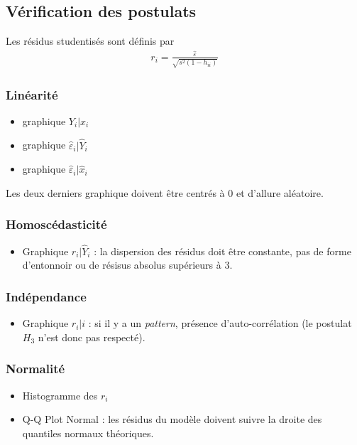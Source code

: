 \documentclass[10pt, french]{article}
\begin{document}
\begin{multicols*}{3}
\subsection*{Vérification des postulats}
Les résidus studentisés sont définis par
\begin{align*}
r_i = \frac{\hat{\varepsilon}}{\sqrt{s^2(1 - h_{ii})}}
\end{align*}
\subsubsection*{Linéarité}
\begin{itemize}
\item graphique $Y_i | x_i$
\item graphique $\hat{\varepsilon}_i | \hat{Y}_i$
\item graphique $\hat{\varepsilon}_i | \hat{x}_i$
\end{itemize}
Les deux derniers graphique doivent être centrés à 0 et d'allure aléatoire.

\subsubsection*{Homoscédasticité}
\begin{itemize}
\item Graphique $r_i | \hat{Y}_i$ : la dispersion des résidus doit être constante, pas de forme d'entonnoir ou de résisus absolus supérieurs à 3.
\end{itemize}

\subsubsection*{Indépendance}
\begin{itemize}
\item Graphique $r_i|i$ : si il y a un \textit{pattern}, présence d'auto-corrélation (le postulat $H_3$ n'est donc pas respecté).
\end{itemize}

\subsubsection*{Normalité}
\begin{itemize}
\item Histogramme des $r_i$
\item Q-Q Plot Normal : les résidus du modèle doivent suivre la droite des quantiles normaux théoriques.
\end{itemize}





\end{multicols*}
\end{document}
